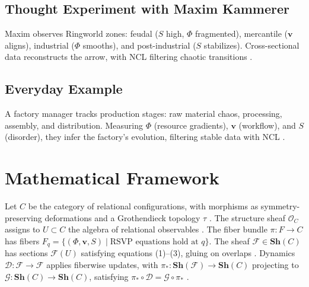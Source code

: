 \documentclass[11pt]{article}
\theoremstyle{plain}
\theoremstyle{definition}
\begin{document}
\subsection{Thought Experiment with Maxim Kammerer}
Maxim observes Ringworld zones: feudal ($S$ high, $\Phi$ fragmented), mercantile ($\mathbf{v}$ aligns), industrial ($\Phi$ smooths), and post-industrial ($S$ stabilizes). Cross-sectional data reconstructs the arrow, with NCL filtering chaotic transitions \citep{Strugatsky1971}.

\subsection{Everyday Example}
A factory manager tracks production stages: raw material chaos, processing, assembly, and distribution. Measuring $\Phi$ (resource gradients), $\mathbf{v}$ (workflow), and $S$ (disorder), they infer the factory’s evolution, filtering stable data with NCL \citep{Jaynes1957}.

\section{Mathematical Framework}
Let $C$ be the category of relational configurations, with morphisms as symmetry-preserving deformations and a Grothendieck topology $\tau$ \citep{MacLane1992}. The structure sheaf $\mathscr{O}_C$ assigns to $U \subset C$ the algebra of relational observables \citep{Awodey2010}. The fiber bundle $\pi: F \to C$ has fibers $F_q = \{(\Phi, \mathbf{v}, S) \mid \text{RSVP equations hold at } q\}$. The sheaf $\mathscr{F} \in \mathbf{Sh}(C)$ has sections $\mathscr{F}(U)$ satisfying equations (1)--(3), gluing on overlaps \citep{Baas2015}. Dynamics $\mathcal{D}: \mathscr{F} \to \mathscr{F}$ applies fiberwise updates, with $\pi_*: \mathbf{Sh}(\mathscr{F}) \to \mathbf{Sh}(C)$ projecting to $\mathcal{G}: \mathbf{Sh}(C) \to \mathbf{Sh}(C)$, satisfying $\pi_* \circ \mathcal{D} = \mathcal{G} \circ \pi_*$ \citep{Isham2003}.
\end{document}
